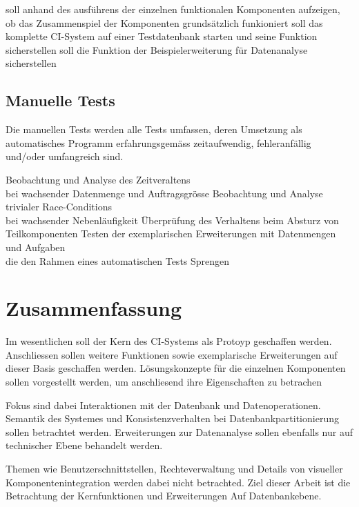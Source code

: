 \begin{description}
  \dhitem[Komponentendurchlauf]
    soll anhand des ausf\"uhrens der einzelnen funktionalen Komponenten
    aufzeigen, ob das Zusammenspiel der Komponenten
    grunds\"atzlich funkioniert
  \dhitem[Komplettstystem]
    soll das komplette CI-System auf einer Testdatenbank starten
    und seine Funktion sicherstellen
    soll die Funktion der Beispielerweiterung f\"ur Datenanalyse sicherstellen
\end{description}

\subsection{Manuelle Tests}

Die manuellen Tests werden alle Tests umfassen,
deren Umsetzung als automatisches Programm erfahrungsgem\"ass zeitaufwendig,
fehleranf\"allig und/oder umfangreich sind.


\begin{description}
    Beobachtung und Analyse des Zeitveraltens \\
    bei wachsender Datenmenge und Auftragsgr\"osse
    Beobachtung und Analyse trivialer Race-Conditions \\
    bei wachsender Nebenl\"aufigkeit
    \"Uberpr\"ufung des Verhaltens beim Absturz von Teilkomponenten
    Testen der exemplarischen Erweiterungen mit Datenmengen und Aufgaben \\
    die den Rahmen eines automatischen Tests Sprengen
\end{description}

\section{Zusammenfassung}


Im wesentlichen soll der Kern des CI-Systems als Protoyp geschaffen werden.
Anschliessen sollen weitere Funktionen sowie exemplarische Erweiterungen
auf dieser Basis geschaffen werden.
L\"osungskonzepte f\"ur die einzelnen Komponenten sollen vorgestellt werden,
um anschliesend ihre Eigenschaften zu betrachen

Fokus sind dabei Interaktionen mit der Datenbank und Datenoperationen.
Semantik des Systemes und Konsistenzverhalten bei Datenbankpartitionierung
sollen betrachtet werden. Erweiterungen zur Datenanalyse sollen ebenfalls nur auf technischer Ebene behandelt werden.

Themen wie Benutzerschnittstellen, Rechteverwaltung und Details von visueller Komponentenintegration werden dabei nicht betrachted.
Ziel dieser Arbeit ist die Betrachtung der Kernfunktionen und Erweiterungen Auf Datenbankebene.


